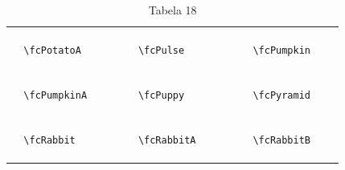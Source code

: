 \documentclass[x11names]{article}
\begin{document}
\begin{table}[H]
\begin{tabular}{|c|c|c|c|c|c|}
		&\multirow{5}{*}{	\fcPotatoA	[scale=0.16]} & &\multirow{5}{*}{	\fcPulse	[scale=0.16]} & &\multirow{5}{*}{	\fcPumpkin	[scale=0.64]}\\	& & & & & \\	& & & & & \\	\verb|	\fcPotatoA	| & & \verb|	\fcPulse	| & & \verb|	\fcPumpkin	| & \\	& & & & & \\	& & & & & \\	& & & & & \\	\hline									
		&\multirow{5}{*}{	\fcPumpkinA	[scale=0.64]} & &\multirow{5}{*}{	\fcPuppy	[scale=0.16]} & &\multirow{5}{*}{	\fcPyramid	[scale=0.16]}\\	& & & & & \\	& & & & & \\	\verb|	\fcPumpkinA	| & & \verb|	\fcPuppy	| & & \verb|	\fcPyramid	| & \\	& & & & & \\	& & & & & \\	& & & & & \\	\hline									
		&\multirow{5}{*}{	\fcRabbit	[scale=0.64]} & &\multirow{5}{*}{	\fcRabbitA	[scale=0.64]} & &\multirow{5}{*}{	\fcRabbitB	[scale=0.16]}\\	& & & & & \\	& & & & & \\	\verb|	\fcRabbit	| & & \verb|	\fcRabbitA	| & & \verb|	\fcRabbitB	| & \\	& & & & & \\	& & & & & \\	& & & & & \\		\hline 	\hline 	\end{tabular}	\caption{	Tabela 18	}\label{	Tab18	}\end{table}
\end{document}
